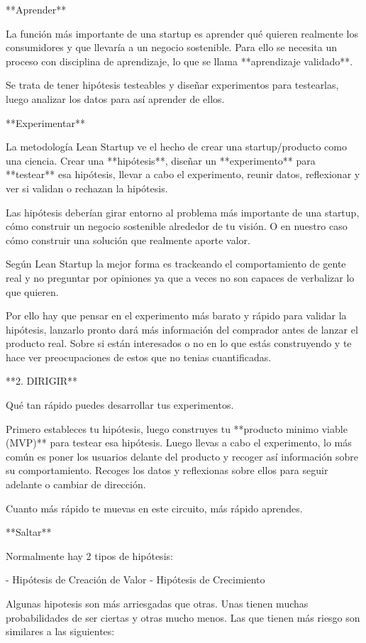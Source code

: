 \documentclass[12pt,twoside,titlepage]{report}
\begin{document}
**Aprender**

La función más importante de una startup es aprender qué quieren realmente los consumidores y que llevaría a un negocio sostenible. Para ello se necesita un proceso con disciplina de aprendizaje, lo que se llama **aprendizaje validado**. 

Se trata de tener hipótesis testeables y diseñar experimentos para testearlas, luego analizar los datos para así aprender de ellos.

**Experimentar**

La metodología Lean Startup ve el hecho de crear una startup/producto como una ciencia. Crear una **hipótesis**, diseñar un **experimento** para **testear** esa hipótesis, llevar a cabo el experimento, reunir datos, reflexionar y ver si validan o rechazan la hipótesis.

Las hipótesis deberían girar entorno al problema más importante de una startup, cómo construir un negocio sostenible alrededor de tu visión. O en nuestro caso cómo construir una solución que realmente aporte valor.

Según Lean Startup la mejor forma es trackeando el comportamiento de gente real y no preguntar por opiniones ya que a veces no son capaces de verbalizar lo que quieren.

Por ello hay que pensar en el experimento más barato y rápido para validar la hipótesis, lanzarlo pronto dará más información del comprador antes de lanzar el producto real. Sobre si están interesados o no en lo que estás construyendo y te hace ver preocupaciones de estos que no tenias cuantificadas.

**2. DIRIGIR**

Qué tan rápido puedes desarrollar tus experimentos.

Primero estableces tu hipótesis, luego construyes tu **producto minimo viable (MVP)** para testear esa hipótesis. Luego llevas a cabo el experimento, lo más común es poner los usuarios delante del producto y recoger así información sobre su comportamiento. Recoges los datos y reflexionas sobre ellos para seguir adelante o cambiar de dirección. 

Cuanto más rápido te muevas en este circuito, más rápido aprendes.

**Saltar**

Normalmente hay 2 tipos de hipótesis: 

- Hipótesis de Creación de Valor
- Hipótesis de Crecimiento

Algunas hipotesis son más arriesgadas que otras. Unas tienen muchas probabilidades de ser ciertas y otras mucho menos. Las que tienen más riesgo son similares a las siguientes: 
\end{document}
